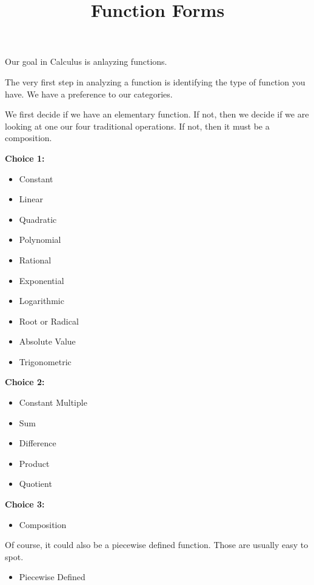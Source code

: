 \documentclass{ximera}
\title{Function Forms}
\begin{document}
\begin{abstract}
%
\end{abstract}
\maketitle



Our goal in Calculus is anlayzing functions.

The very first step in analyzing a function is identifying the type of function you have. We have a preference to our categories. 

We first decide if we have an elementary function. If not, then we decide if we are looking at one our four traditional operations.  If not, then it must be a composition.



\textbf{\textcolor{blue!55!black}{Choice 1:}}
\begin{itemize}
\item Constant
\item Linear
\item Quadratic
\item Polynomial
\item Rational
\item Exponential
\item Logarithmic
\item Root or Radical
\item Absolute Value
\item Trigonometric
\end{itemize}



\textbf{\textcolor{blue!55!black}{Choice 2:}}
\begin{itemize}
\item Constant Multiple
\item Sum
\item Difference
\item Product
\item Quotient
\end{itemize}



\textbf{\textcolor{blue!55!black}{Choice 3:}}
\begin{itemize}
\item Composition
\end{itemize}




Of course, it could also be a piecewise defined function.  Those are usually easy to spot.
\begin{itemize}
\item Piecewise Defined
\end{itemize}
\end{document}
